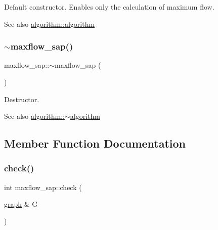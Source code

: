 Default constructor. Enables only the calculation of maximum flow.

\begin{DoxySeeAlso}{See also}
\mbox{\hyperlink{classalgorithm_ab79e1ddec2f2afdf4b36b10724db8b15}{algorithm\+::algorithm}} 
\end{DoxySeeAlso}
\mbox{\label{classmaxflow__sap_ab49914afde43ffa0e5c3049cc063a8d2}} 
\subsubsection{\texorpdfstring{$\sim$maxflow\+\_\+sap()}{~maxflow\_sap()}}
{\footnotesize\ttfamily maxflow\+\_\+sap\+::$\sim$maxflow\+\_\+sap (\begin{DoxyParamCaption}{ }\end{DoxyParamCaption})\hspace{0.3cm}{\ttfamily [virtual]}}

Destructor.

\begin{DoxySeeAlso}{See also}
\mbox{\hyperlink{classalgorithm_adca9b1e7fa3afd914519a9dbb44e9fd5}{algorithm\+::$\sim$algorithm}} 
\end{DoxySeeAlso}


\subsection{Member Function Documentation}
\mbox{\label{classmaxflow__sap_aa2974bf25fb597677848fdb23c12d338}} 
\subsubsection{\texorpdfstring{check()}{check()}}
{\footnotesize\ttfamily int maxflow\+\_\+sap\+::check (\begin{DoxyParamCaption}\item[{\mbox{\hyperlink{classgraph}{graph}} \&}]{G }\end{DoxyParamCaption})\hspace{0.3cm}{\ttfamily [virtual]}}

